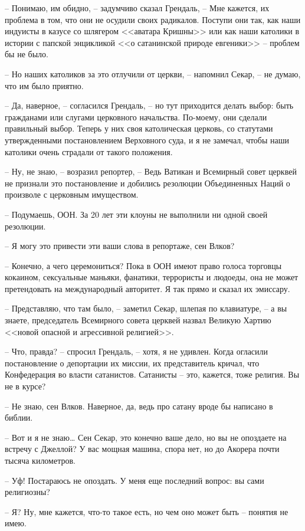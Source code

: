 -- Понимаю, им обидно, -- задумчиво сказал Грендаль, -- Мне кажется, их проблема в том, что они не осудили своих радикалов. Поступи они так, как наши индуисты в казусе со шлягером <<аватара Кришны>> или как наши католики в истории с папской энцикликой <<о сатанинской природе евгеники>> -- проблем бы не было.

-- Но наших католиков за это отлучили от церкви, -- напомнил Секар, -- не думаю, что им было приятно.

-- Да, наверное, -- согласился Грендаль, -- но тут приходится делать выбор: быть гражданами или слугами церковного начальства. По-моему, они сделали правильный выбор. Теперь у них своя католическая церковь, со статутами утвержденными постановлением Верховного суда, и я не замечал, чтобы наши католики очень страдали от такого положения.

-- Ну, не знаю, -- возразил репортер, -- Ведь Ватикан и Всемирный совет церквей не признали это постановление и добились резолюции Объединенных Наций о произволе с церковным имуществом.

-- Подумаешь, ООН. За 20 лет эти клоуны не выполнили ни одной своей резолюции.

-- Я могу это привести эти ваши слова в репортаже, сен Влков?

-- Конечно, а чего церемониться? Пока в ООН имеют право голоса торговцы кокаином, сексуальные маньяки, фанатики, террористы и людоеды, она не может претендовать на международный авторитет. Я так прямо и сказал их эмиссару.

-- Представляю, что там было, -- заметил Секар, шлепая по клавиатуре, -- а вы знаете, председатель Всемирного совета церквей назвал Великую Хартию <<новой опасной и агрессивной религией>>.

-- Что, правда? -- спросил Грендаль, -- хотя, я не удивлен. Когда огласили постановление о депортации их миссии, их представитель кричал, что Конфедерация во власти сатанистов. Сатанисты -- это, кажется, тоже религия. Вы не в курсе?

-- Не знаю, сен Влков. Наверное, да, ведь про сатану вроде бы написано в библии.

-- Вот и я не знаю\ldots{} Сен Секар, это конечно ваше дело, но вы не опоздаете на встречу с Джеллой? У вас мощная машина, спора нет, но до Акорера почти тысяча километров.

-- Уф! Постараюсь не опоздать. У меня еще последний вопрос: вы сами религиозны?

-- Я? Ну, мне кажется, что-то такое есть, но чем оно может быть -- понятия не имею.

